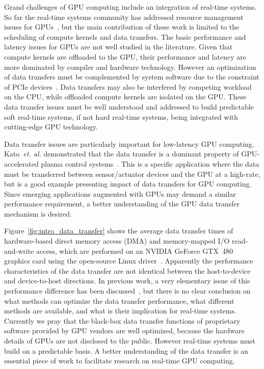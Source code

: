 Grand challenges of GPU computing include an integration of real-time
systems.
So far the real-time systems community has addressed resource management
issues for GPUs~\cite{Basaran_ECRTS12, Elliott_RTS12, Elliott_ECRTS12,
Kato_ATC11, Kato_RTAS11, Kato_RTSS11}, but the main contribution of
these work is limited to the scheduling of compute kernels and data
transfers.
The basic performance and latency issues for GPUs are not well studied
in the literature.
Given that compute kernels are offloaded to the GPU, their performance
and latency are more dominated by compiler and hardware technology.
However an optimization of data transfers must be complemented by system
software due to the constraint of PCIe devices~\cite{Kato_ATC12}.
Data transfers may also be interfered by competing workload on the CPU,
while offloaded compute kernels are isolated on the GPU.
These data transfer issues must be well understood and addressed to
build predictable soft real-time systems, if not hard real-time systems,
being integrated with cutting-edge GPU technology.

Data transfer issues are particularly important for low-latency GPU
computing.
Kato~\textit{et. al.} demonstrated that the data transfer is a dominant
property of GPU-accelerated plasma control systems~\cite{Kato_ICCPS13}.
This is a specific application where the data must be transferred
between sensor/actuator devices and the GPU at a high-rate, but is a
good example presenting impact of data transfers for GPU computing.
Since emerging applications augmented with GPUs may demand a similar
performance requirement, a better understanding of the GPU data transfer
mechanism is desired.

Figure~\ref{fig:intro_data_transfer} shows the average data transfer
times of hardware-based direct memory access (DMA) and memory-mapped I/O
read-and-write access, which are performed on an NVIDIA GeForce GTX~480
graphics card using the open-source Linux driver~\cite{Kato_ATC12}.
Apparently the performance characteristics of the data transfer are not
identical between the host-to-device and device-to-host directions.
In previous work, a very elementary issue of this performance difference
has been discussed~\cite{Kato_ATC12}, but there is no clear conclusion on what
methods can optimize the data transfer performance, what different
methods are available, and what is their implication for real-time
systems.
Currently we pray that the black-box data transfer functions of
proprietary software provided by GPU vendors are well optimized, because
the hardware details of GPUs are not disclosed to the public.
However real-time systems must build on a predictable basis.
A better understanding of the data transfer is an essential piece of
work to facilitate research on real-time GPU computing.

